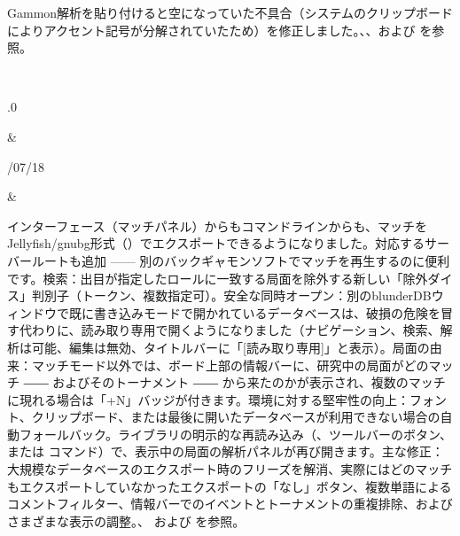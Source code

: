 \documentclass[letterpaper,10pt,dvipdfmx]{sphinxmanual}
\begin{document}
\begin{savenotes}
\begin{longtable}{}
\begin{varwidth}[t]{}
Gammon解析を貼り付けると空になっていた不具合（システムのクリップボードによりアクセント記号が分解されていたため）を修正しました。{\hyperref[\detokenize{mode_headless:headless}]{}}、{\hyperref[\detokenize{cmd_mode:cmd-mode}]{}}、および {\hyperref[\detokenize{telecharge_install:telecharge-install}]{}} を参照。
\sphinxbeforeendvarwidth
\end{varwidth}%
\\
\sphinxhline\begin{varwidth}[t]{}
.0
\sphinxbeforeendvarwidth
\end{varwidth}%
&\begin{varwidth}[t]{}
/07/18
\sphinxbeforeendvarwidth
\end{varwidth}%
&\begin{varwidth}[t]{}
\sphinxAtStartPar
インターフェース（マッチパネル）からもコマンドラインからも、マッチをJellyfish/gnubg形式（）でエクスポートできるようになりました。対応するサーバールートも追加 —— 別のバックギャモンソフトでマッチを再生するのに便利です。検索：出目が指定したロールに一致する局面を除外する新しい「除外ダイス」判別子（トークン、複数指定可）。安全な同時オープン：別のblunderDBウィンドウで既に書き込みモードで開かれているデータベースは、破損の危険を冒す代わりに、読み取り専用で開くようになりました（ナビゲーション、検索、解析は可能、編集は無効、タイトルバーに「{[}読み取り専用{]}」と表示）。局面の由来：マッチモード以外では、ボード上部の情報バーに、研究中の局面がどのマッチ ―― およびそのトーナメント ―― から来たのかが表示され、複数のマッチに現れる場合は「+N」バッジが付きます。環境に対する堅牢性の向上：フォント、クリップボード、または最後に開いたデータベースが利用できない場合の自動フォールバック。ライブラリの明示的な再読み込み（、ツールバーのボタン、または  コマンド）で、表示中の局面の解析パネルが再び開きます。主な修正：大規模なデータベースのエクスポート時のフリーズを解消、実際にはどのマッチもエクスポートしていなかったエクスポートの「なし」ボタン、複数単語によるコメントフィルター、情報バーでのイベントとトーナメントの重複排除、およびさまざまな表示の調整。{\hyperref[\detokenize{cmd_mode:cmd-mode}]{}}、{\hyperref[\detokenize{manuel:panneau-matchs}]{}} および {\hyperref[\detokenize{manuel:manuel}]{}} を参照。

\end{varwidth}
\end{longtable}
\end{savenotes}
\end{document}
